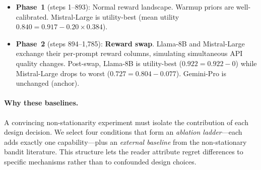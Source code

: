\begin{itemize}[nosep,leftmargin=*]
  \item \textbf{Phase~1} (steps 1--893): Normal reward landscape.
    Warmup priors are well-calibrated.
    Mistral-Large is utility-best
    (mean utility $0.840 = 0.917 - 0.20 \times 0.384$).

  \item \textbf{Phase~2} (steps 894--1{,}785): \textbf{Reward swap}.
    Llama-8B and Mistral-Large exchange their per-prompt reward
    columns, simulating simultaneous API quality changes.
    Post-swap, Llama-8B is utility-best
    ($0.922 = 0.922 - 0$) while Mistral-Large drops to worst
    ($0.727 = 0.804 - 0.077$).  Gemini-Pro is unchanged (anchor).
\end{itemize}

\paragraph{Why these baselines.}
A convincing non-stationarity experiment must isolate the
contribution of each design decision.
We select four conditions that form an \emph{ablation ladder}---each
adds exactly one capability---plus an \emph{external baseline} from
the non-stationary bandit literature.
This structure lets the reader attribute regret differences to
specific mechanisms rather than to confounded design choices.

